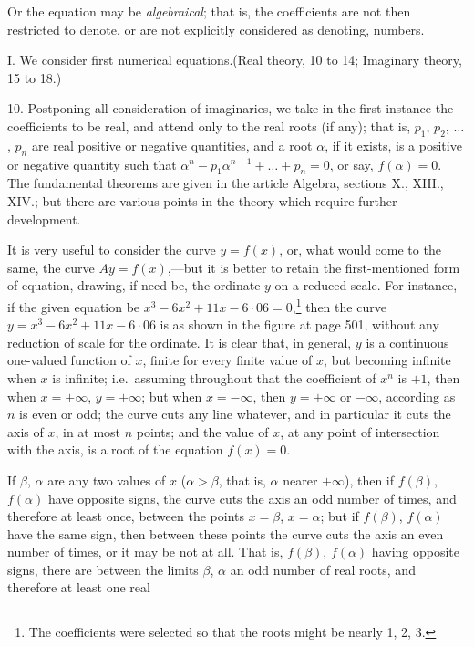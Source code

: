 \documentclass[12pt,a4paper,oneside]{book}
\begin{document}
Or the equation may be \textit{algebraical}; that is, the coefficients are not then restricted to denote, or are not explicitly considered as denoting, numbers.

I. We consider first numerical equations.\quad (Real theory, 10 to 14; Imaginary theory, 15 to 18.)

10. Postponing all consideration of imaginaries, we take in the first instance the coefficients to be real, and attend only to the real roots (if any); that is, $p_{1}$, $p_{2}$, $\dots$, $p_{n}$ are real positive or negative quantities, and a root $\alpha$, if it exists, is a positive or negative quantity such that $\alpha^{n}-p_{1}\alpha^{n-1}+\dots+p_{n}=0$, or say, $f(\alpha)=0$. The fundamental theorems are given in the article Algebra, sections X., XIII., XIV.; but there are various points in the theory which require further development.

It is very useful to consider the curve $y=f(x)$, or, what would come to the same, the curve $Ay=f(x)$,---but it is better to retain the first-mentioned form of equation, drawing, if need be, the ordinate $y$ on a reduced scale. For instance, if the given equation be $x^{3}-6x^{2}+11x-6\cdot 06=0$,\footnote{The coefficients were selected so that the roots might be nearly 1, 2, 3.} then the curve $y=x^{3}-6x^{2}+11x-6\cdot 06$ is as shown in the figure at page 501, without any reduction of scale for the ordinate. It is clear that, in general, $y$ is a continuous one-valued function of $x$, finite for every finite value of $x$, but becoming infinite when $x$ is infinite; i.e.\ assuming throughout that the coefficient of $x^{n}$ is $+1$, then when $x=+\infty$, $y=+\infty$; but when $x=-\infty$, then $y=+\infty$ or $-\infty$, according as $n$ is even or odd; the curve cuts any line whatever, and in particular it cuts the axis of $x$, in at most $n$ points; and the value of $x$, at any point of intersection with the axis, is a root of the equation $f(x)=0$.

If $\beta$, $\alpha$ are any two values of $x$ ($\alpha>\beta$, that is, $\alpha$ nearer $+\infty$), then if $f(\beta)$, $f(\alpha)$ have opposite signs, the curve cuts the axis an odd number of times, and therefore at least once, between the points $x=\beta$, $x=\alpha$; but if $f(\beta)$, $f(\alpha)$ have the same sign, then between these points the curve cuts the axis an even number of times, or it may be not at all. That is, $f(\beta)$, $f(\alpha)$ having opposite signs, there are between the limits $\beta$, $\alpha$ an odd number of real roots, and therefore at least one real
\end{document}
